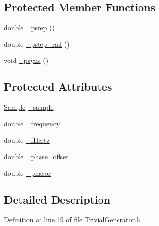 \subsection*{Protected Member Functions}
\begin{DoxyCompactItemize}
\item 
double \hyperlink{classSignal_1_1SignalGenerator_a43b0eec84ee7df04c947533c0511c2c0}{\+\_\+pstep} ()
\item 
double \hyperlink{classSignal_1_1SignalGenerator_abf2f4ab977c6e84bf85022eab8135304}{\+\_\+pstep\+\_\+rad} ()
\item 
void \hyperlink{classSignal_1_1SignalGenerator_a563f57d4dfd8728a6a572f15c1e2532b}{\+\_\+psync} ()
\end{DoxyCompactItemize}
\subsection*{Protected Attributes}
\begin{DoxyCompactItemize}
\item 
\hyperlink{classSignal_1_1Sample}{Sample} \hyperlink{classSignal_1_1Trivial_1_1TrivialGenerator_a2e43e1ae605338b92e48974a681866e9}{\+\_\+sample}
\item 
double \hyperlink{classSignal_1_1SignalGenerator_a7f107461333bce68c5dad412db96a8c2}{\+\_\+frequency}
\item 
double \hyperlink{classSignal_1_1SignalGenerator_a85a4702347352bab1c71e0a8df8437d6}{\+\_\+f\+Hertz}
\item 
double \hyperlink{classSignal_1_1SignalGenerator_a6b4444d46747c8517171edbbf4b5588f}{\+\_\+phase\+\_\+offset}
\item 
double \hyperlink{classSignal_1_1SignalGenerator_af4aa0728ded00777be26a06d883eaeb3}{\+\_\+phasor}
\end{DoxyCompactItemize}


\subsection{Detailed Description}


Definition at line 19 of file Trivial\+Generator.\+h.



